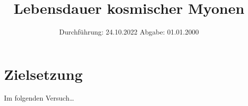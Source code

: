 

\subject{V01}
\title{Lebensdauer kosmischer Myonen}
\date{
    Durchführung: 24.10.2022
     \hspace{3em}
    Abgabe: 01.01.2000 %
}


\maketitle
\thispagestyle{empty}
\tableofcontents
\newpage

\section{Zielsetzung}

    Im folgenden Versuch… %


\clearpage


\clearpage


\clearpage


\clearpage

\printbibliography


